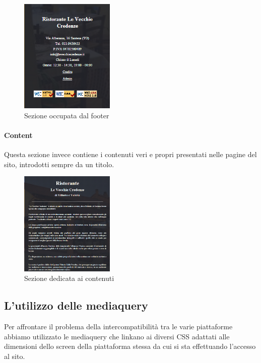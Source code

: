 \begin{figure}[H]
		\centering \includegraphics[width=0.4\textwidth]{images/footer.png}
		\caption{Sezione occupata dal footer}
\end{figure}

\paragraph{Content}

Questa sezione invece contiene i contenuti veri e propri presentati nelle pagine del sito, introdotti sempre da un titolo.

\begin{figure}[H]
		\centering \includegraphics[width=0.4\textwidth]{images/content.png}
		\caption{Sezione dedicata ai contenuti}
\end{figure}

\subsection{L’utilizzo delle mediaquery}

Per affrontare il problema della intercompatibilità tra le varie piattaforme abbiamo utilizzato le mediaquery che linkano ai diversi CSS adattati alle dimensioni dello screen della piattaforma stessa da cui si sta effettuando l’accesso al sito.

